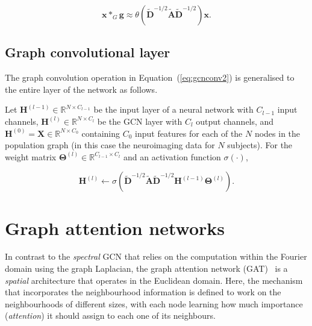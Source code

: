 \begin{equation}
    \label{eq:gcnconv2}
    \mathbf{x} *_G \mathbf{g} \approx \theta(\mathbf{\tilde{D}}^{-1/2}\mathbf{\tilde{A}}\mathbf{\tilde{D}}^{-1/2})\mathbf{x}.
\end{equation}
 


\subsection{Graph convolutional layer}
The graph convolution operation in Equation~(\ref{eq:gcnconv2}) is generalised to the entire layer of the network as follows. 

Let $\mathbf{H}^{(l-1)} \in \mathbb{R}^{N\times C_{l-1}}$ be the input layer of a neural network with $C_{l-1}$ input channels, $\mathbf{H}^{(l)} \in \mathbb{R}^{N\times C_{l}}$ be the GCN layer with $C_{l}$ output channels, and $\mathbf{H}^{(0)} = \mathbf{X} \in \mathbb{R}^{N \times C_0}$ containing $C_0$ input features for each of the $N$ nodes in the population graph (in this case the neuroimaging data for $N$ subjects). For the weight matrix $\mathbf{\Theta}^{(l)} \in \mathbb{R}^{C_{l-1}\times C_{l}}$ and an activation function $\sigma(\cdot)$,

\begin{equation}
    \mathbf{H}^{(l)} \leftarrow \sigma( \mathbf{\tilde{D}}^{-1/2}\mathbf{\tilde{A}}\mathbf{\tilde{D}}^{-1/2}\mathbf{H}^{(l-1)}\mathbf{\Theta}^{(l)}).
\end{equation}

\section{Graph attention networks}
\label{training-gat}

In contrast to the \textit{spectral} GCN that relies on the computation within the Fourier domain using the graph Laplacian, the graph attention network (GAT)~\cite{velickovic2018graph} is a \textit{spatial} architecture that operates in the Euclidean domain. Here, the mechanism that incorporates the neighbourhood information is defined to work on the neighbourhoods of different sizes, with each node learning how much importance (\textit{attention}) it should assign to each one of its neighbours.

